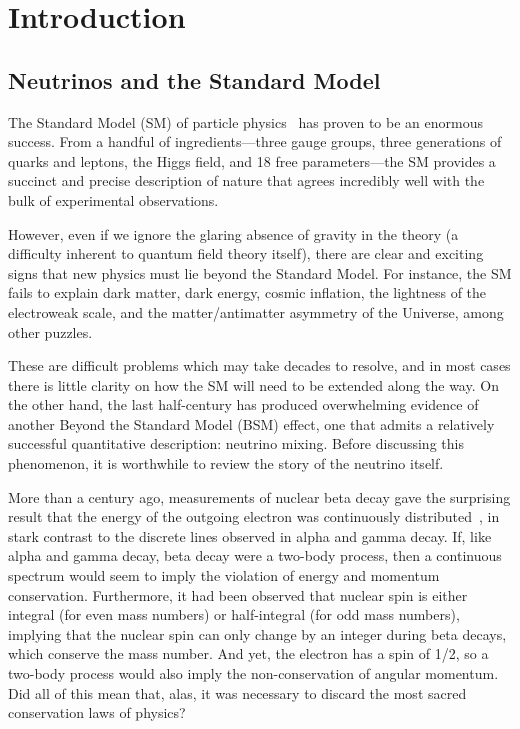 \documentclass[../thesis.tex]{subfiles}
\begin{document}
\chapter{Introduction}
\label{chap:intro}

\section{Neutrinos and the Standard Model}
\label{sec:neuAndSM}

The Standard Model (SM) of particle physics~\cite{Rosner_2001zy} has proven to be an enormous success. From a handful of ingredients---three gauge groups, three generations of quarks and leptons, the Higgs field, and 18 free parameters---the SM provides a succinct and precise description of nature that agrees incredibly well with the bulk of experimental observations.

However, even if we ignore the glaring absence of gravity in the theory (a difficulty inherent to quantum field theory itself), there are clear and exciting signs that new physics must lie beyond the Standard Model. For instance, the SM fails to explain dark matter, dark energy, cosmic inflation, the lightness of the electroweak scale, and the matter/antimatter asymmetry of the Universe, among other puzzles.

These are difficult problems which may take decades to resolve, and in most cases there is little clarity on how the SM will need to be extended along the way. On the other hand, the last half-century has produced overwhelming evidence of another Beyond the Standard Model (BSM) effect, one that admits a relatively successful quantitative description: neutrino mixing. Before discussing this phenomenon, it is worthwhile to review the story of the neutrino itself.

More than a century ago, measurements of nuclear beta decay gave the surprising result that the energy of the outgoing electron was continuously distributed~\cite{Chadwick:262756}, in stark contrast to the discrete lines observed in alpha and gamma decay. If, like alpha and gamma decay, beta decay were a two-body process, then a continuous spectrum would seem to imply the violation of energy and momentum conservation. Furthermore, it had been observed that nuclear spin is either integral (for even mass numbers) or half-integral (for odd mass numbers), implying that the nuclear spin can only change by an integer during beta decays, which conserve the mass number. And yet, the electron has a spin of 1/2, so a two-body process would also imply the non-conservation of angular momentum. Did all of this mean that, alas, it was necessary to discard the most sacred conservation laws of physics?
\end{document}
